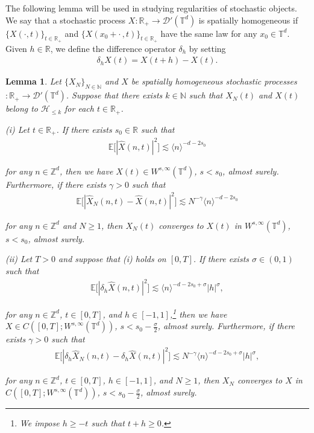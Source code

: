 \documentclass[%
11pt,  reqno]{amsart}
\newtheorem{lemma}[theorem]{Lemma}
\newcommand{\1}{\hspace{0.2mm}\text{I}\hspace{0.2mm}}
\newcommand{\noi}{\noindent}
\newcommand{\Z}{\mathbb{Z}}
\newcommand{\R}{\mathbb{R}}
\newcommand{\T}{\mathbb{T}}
\newcommand{\E}{\mathbb{E}}
\newcommand{\dl}{\delta}
\newcommand{\g}{\gamma}
\newcommand{\s}{\sigma}
\newcommand{\ft}{\widehat}
\newcommand{\les}{\lesssim}
\newcommand{\jb}[1]
{\langle #1 \rangle}
\newcommand{\N}{\mathbb{N}}
\renewcommand{\H}{\mathcal{H}}
\numberwithin{equation}{section}
\numberwithin{theorem}{section}
\begin{document}
The following lemma will be used in studying regularities of stochastic objects.
We say that a stochastic process $X:\R_+ \to \mathcal{D}'(\T^d)$
is spatially homogeneous  if  $\{X(\cdot, t)\}_{t\in \R_+}$
and $\{X(x_0 +\cdot\,, t)\}_{t\in \R_+}$ have the same law for any $x_0 \in \T^d$.
Given $h \in \R$, we define the difference operator $\dl_h$ by setting
\begin{align}
\dl_h X(t) = X(t+h) - X(t).
\label{diff1}
\end{align}

\begin{lemma}\label{LEM:reg}
Let $\{ X_N \}_{N \in \N}$ and $X$ be spatially homogeneous stochastic processes
$:\R_+ \to \mathcal{D}'(\T^d)$.
Suppose that there exists $k \in \N$ such that 
  $X_N(t)$ and $X(t)$ belong to $\H_{\leq k}$ for each $t \in \R_+$.

\smallskip
\noi\textup{(i)}
Let $t \in \R_+$.
If there exists $s_0 \in \R$ such that 
\begin{align*}
\E\big[ |\ft X(n, t)|^2\big]\les \jb{n}^{ - d - 2s_0}
\end{align*}

\noi
for any $n \in \Z^d$, then  
we have
$X(t) \in W^{s, \infty}(\T^d)$, $s < s_0$, 
almost surely.
Furthermore, if there exists $\g > 0$ such that 
\begin{align*}
\E\big[ |\ft X_N(n, t) - \ft X(n, t)|^2\big]\les N^{-\g} \jb{n}^{ - d - 2s_0}
\end{align*}

\noi
for any $n \in \Z^d$ and $N \geq 1$, 
then 
$X_N(t)$ converges to $X(t)$ in $W^{s, \infty}(\T^d)$, $s < s_0$, 
almost surely.


\noi


\smallskip
\noi\textup{(ii)}
Let $T > 0$ and suppose that \textup{(i)} holds on $[0, T]$.
If there exists $\s \in (0, 1)$ such that 
\begin{align*}
 \E\big[ |\dl_h \ft X(n, t)|^2\big]
 \les \jb{n}^{ - d - 2s_0+ \s}
|h|^\s, 
\end{align*}

\noi
for any  $n \in \Z^d$, $t \in [0, T]$, and $h \in [-1, 1]$,\footnote{We impose $h \geq - t$ such that $t + h \geq 0$.}
then we have 
$X \in C([0, T]; W^{s, \infty}(\T^d))$, 
$s < s_0 - \frac \s2$,  almost surely.
Furthermore, 
if there exists $\g > 0$ such that 
\begin{align*}
 \E\big[ |\dl_h \ft X_N(n, t) - \dl_h \ft X(n, t)|^2\big]
 \les N^{-\g}\jb{n}^{ - d - 2s_0+ \s}
|h|^\s, 
\end{align*}

\noi
for any  $n \in \Z^d$, $t \in [0, T]$,  $h \in [-1, 1]$, and $N \geq 1$, 
then 
$X_N$ converges to $X$ in $C([0, T]; W^{s, \infty}(\T^d))$, $s < s_0 - \frac{\s}{2}$,
almost surely.



\end{lemma}
\end{document}
